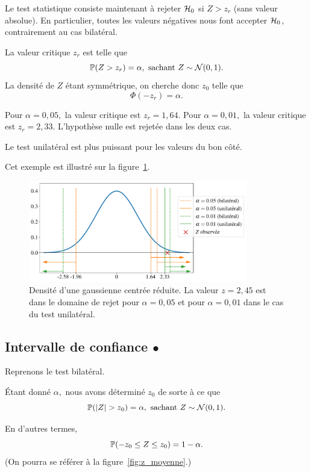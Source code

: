 \begin{answer}
	Le test statistique consiste maintenant à rejeter $\mathcal{H}_0$ si $Z > z_r$ (sans
	valeur absolue). En particulier, toutes les valeurs négatives nous font
	accepter $\mathcal{H}_0$, contrairement au cas bilatéral.
	
	La valeur critique $z_r$ est telle que 
	\[
	\mathbb{P}(Z > z_r) = \alpha, \text{ sachant } Z \sim \mathcal{N}(0, 1).
	\]
	La densité de $Z$ étant symmétrique, on cherche donc $z_0$ telle que 
	\[
	\Phi(-z_r) = \alpha.
	\]
	
	Pour $\alpha = 0,05,$ la valeur critique est $z_r = 1,64.$ Pour
	$\alpha = 0,01,$ la valeur critique est $z_r = 2,33.$ L'hypothèse nulle est
	rejetée dans les deux cas.
	
	Le test unilatéral est plus puissant pour les valeurs du bon côté.
	
	Cet exemple est illustré sur la figure~\ref{fig:z_pigeons_unilateral}.
\end{answer}


\begin{figure}[h]
	\centering
	\includegraphics[width=0.85\textwidth]{figures/tests/z_pigeons_unilateral}
	\caption{Densité d'une gaussienne centrée réduite. La valeur $z=2,45$ est
		dans le domaine de rejet pour $\alpha = 0,05$ et pour $\alpha = 0,01$ dans
		le cas du test unilatéral.}
	\label{fig:z_pigeons_unilateral}
\end{figure}

\subsection{Intervalle de confiance $\bullet$}
\label{sec:ic}
Reprenons le test bilatéral.

Étant donné $\alpha,$ nous avons déterminé $z_0$ de sorte à ce que
\[
\mathbb{P}(\lvert Z\rvert > z_0) = \alpha, \text{ sachant } Z \sim \mathcal{N}(0, 1).
\]

En d'autres termes, 
\[
\mathbb{P}(-z_0 \leq Z \leq z_0) = 1 - \alpha. 
\]
(On pourra se référer à la figure~\ref{fig:z_moyenne}.)

